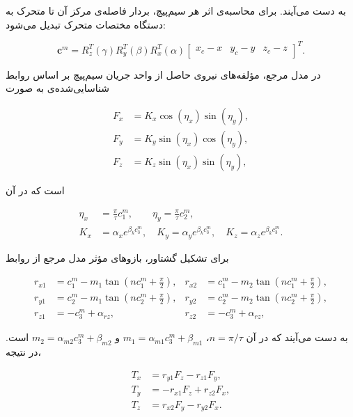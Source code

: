 به دست می‌آیند. برای محاسبه‌ی اثر هر سیم‌پیچ، بردار فاصله‌ی مرکز آن تا متحرک به دستگاه مختصات متحرک تبدیل می‌شود:

\begin{equation}
	\mathbf c^{m}=R_z^{T}(\gamma)R_y^{T}(\beta)R_x^{T}(\alpha)
	\begin{bmatrix}x_c-x&y_c-y&z_c-z\end{bmatrix}^{T}.
	\label{eq:method-cm-vector}
\end{equation}

در مدل مرجع، مؤلفه‌های نیروی حاصل از واحد جریان سیم‌پیچ بر اساس روابط شناسایی‌شده‌ی \cite{xuModularMaglevDesign2024d} به صورت

\begin{align}
	F_x&=K_x\cos(\eta_x)\sin(\eta_y),\\
	F_y&=K_y\sin(\eta_x)\cos(\eta_y),\\
	F_z&=K_z\sin(\eta_x)\sin(\eta_y),
	\label{eq:method-force-components}
\end{align}

است که در آن

\begin{align}
	\eta_x&=\frac{\pi}{\tau}c_1^m,\qquad \eta_y=\frac{\pi}{\tau}c_2^m,\label{eq:method-eta}\\
	K_x&=\alpha_xe^{\beta_kc_3^m},\quad K_y=\alpha_ye^{\beta_kc_3^m},\quad K_z=\alpha_ze^{\beta_kc_3^m}.
	\label{eq:method-Kfactors}
\end{align}

برای تشکیل گشتاور، بازوهای مؤثر مدل مرجع از روابط

\begin{align}
	r_{x1}&=c_1^m-m_1\tan\left(nc_1^m+\frac{\pi}{2}\right), & r_{x2}&=c_1^m-m_2\tan\left(nc_1^m+\frac{\pi}{2}\right),\\
	r_{y1}&=c_2^m-m_1\tan\left(nc_2^m+\frac{\pi}{2}\right), & r_{y2}&=c_2^m-m_2\tan\left(nc_2^m+\frac{\pi}{2}\right),\\
	r_{z1}&=-c_3^m+\alpha_{rz}, & r_{z2}&=-c_3^m+\alpha_{rz},
	\label{eq:method-effective-arms}
\end{align}

به دست می‌آیند که در آن $n=\pi/\tau$، $m_1=\alpha_{m1}c_3^m+\beta_{m1}$ و $m_2=\alpha_{m2}c_3^m+\beta_{m2}$ است. در نتیجه،

\begin{align}
	T_x&=r_{y1}F_z-r_{z1}F_y,\\
	T_y&=-r_{x1}F_z+r_{z2}F_x,\\
	T_z&=r_{x2}F_y-r_{y2}F_x.
	\label{eq:method-torque-components}
\end{align}

